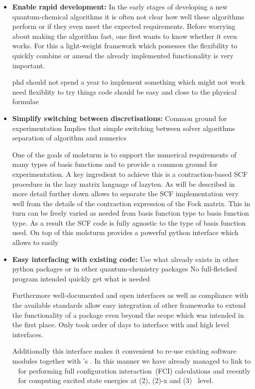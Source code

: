 \begin{itemize}
\item \textbf{Enable rapid development:}
In the early stages of developing a new quantum-chemical algorithms
it is often not clear how well these algorithms perform
or if they even meet the expected requirements.
Before worrying about making the algorithm fast,
one first wants to know whether it even works.
For this a light-weight framework which possesses the flexibility
to quickly combine or amend the already implemented
functionality is very important.

phd should not spend a year to implement something which might not work
need flexiblity to try things
code should be easy and close to the physical formulae
%
%
\item \textbf{Simplify switching between discretisations:}
Common ground for experimentation
Implies that simple switching between solver algorithms
separation of algorithm and numerics

One of the goals of molsturm is to support the numerical requirements of many
types of basis functions and to provide a common ground for experimentation. A key
ingredient to achieve this is a contraction-based SCF procedure in the lazy matrix
language of lazyten. 
As will be described in more detail further down
allows to separate the SCF implementation very well from the details of the contraction
expression of the Fock matrix. This in turn can be freely varied as needed from basis
function type to basis function type. As a result the SCF code is fully agnostic to the
type of basis function used.
On top of this molsturm provides a powerful python interface which allows to easily

%
%
\item \textbf{Easy interfacing with existing code:}
Use what already exists in other python packages or in other quantum-chemistry packages
No full-fletched program intended
quickly get what is needed

Furthermore well-documented and open interfaces
as well as compliance with the available standards
allow easy integration of other frameworks to extend
the functionality of a package even beyond the scope
which was intended in the first place.
Only took order of days to interface with \pyscf and \adcman
high level interfaces.


Additionally this interface makes it
convenient to re-use existing software modules
together with \molsturm's \SCF.
In this manner we have already managed to link \molsturm to \pyscf~\cite{Sun2017}
for performing full configuration interaction~(FCI) calculations
and recently \adcman~\cite{Wormit2014}
for computing excited state energies at \ADC(2),
\ADC(2)-x and \ADC(3)~\cite{Schirmer1982,Trofimov1999} level.



\end{itemize}
